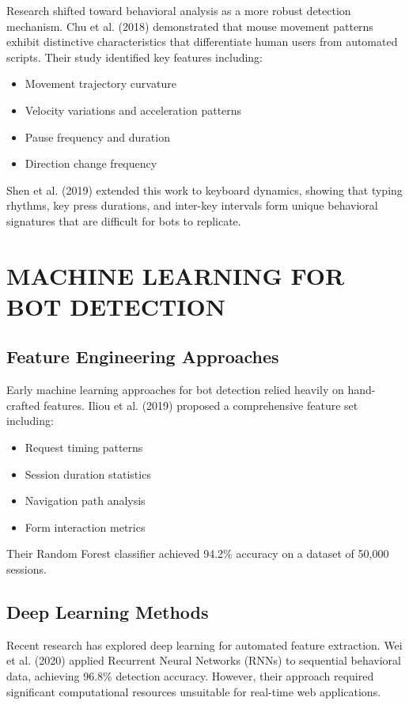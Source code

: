 Research shifted toward behavioral analysis as a more robust detection mechanism. Chu et al. (2018) demonstrated that mouse movement patterns exhibit distinctive characteristics that differentiate human users from automated scripts. Their study identified key features including:
\begin{itemize}
    \item Movement trajectory curvature
    \item Velocity variations and acceleration patterns
    \item Pause frequency and duration
    \item Direction change frequency
\end{itemize}

Shen et al. (2019) extended this work to keyboard dynamics, showing that typing rhythms, key press durations, and inter-key intervals form unique behavioral signatures that are difficult for bots to replicate.

\section{MACHINE LEARNING FOR BOT DETECTION}

\subsection{Feature Engineering Approaches}

Early machine learning approaches for bot detection relied heavily on hand-crafted features. Iliou et al. (2019) proposed a comprehensive feature set including:
\begin{itemize}
    \item Request timing patterns
    \item Session duration statistics
    \item Navigation path analysis
    \item Form interaction metrics
\end{itemize}

Their Random Forest classifier achieved 94.2\% accuracy on a dataset of 50,000 sessions.

\subsection{Deep Learning Methods}

Recent research has explored deep learning for automated feature extraction. Wei et al. (2020) applied Recurrent Neural Networks (RNNs) to sequential behavioral data, achieving 96.8\% detection accuracy. However, their approach required significant computational resources unsuitable for real-time web applications.

